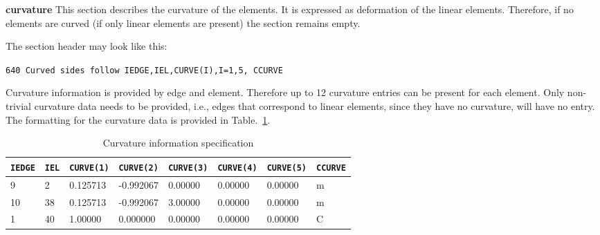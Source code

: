 \begin{description}
%


\item{\bf curvature} 
     This section describes the curvature of the elements. It is expressed as deformation of the linear elements.  
     Therefore, if no elements are curved (if only linear elements are present) the section remains empty.

     The section header may look like this:

     \begin{center}
     \texttt{640 Curved sides follow IEDGE,IEL,CURVE(I),I=1,5, CCURVE}
     \end{center}

     Curvature information is provided by edge and element. Therefore up to 12 curvature entries can be present for each element.
Only non-trivial curvature data needs to be provided, i.e., edges that correspond to linear elements, since they have no curvature, will have no entry.
The formatting for the curvature data is provided in Table.~\ref{tab:midside}. 

\footnotesize
\begin{table} 
     \begin{center}
\begin{tabular}{ l|l|l|l|l|l|l|l }
   \hline
 \texttt{IEDGE}& \texttt{IEL} &\texttt{CURVE(1)} &\texttt{CURVE(2)}&\texttt{CURVE(3)}&\texttt{CURVE(4)}&\texttt{CURVE(5)}&\texttt{CCURVE} \\ \hline \hline
 9   &  2 & 0.125713  &   -0.992067 &      0.00000  &     0.00000 &      0.00000  &   m \\
10   & 38 & 0.125713 &    -0.992067  &     3.00000 &      0.00000  &     0.00000 &    m \\
 1   & 40 & 1.00000  &     0.000000  &     0.00000 &      0.00000  &     0.00000 &    C \\
   \hline
\end{tabular}  
\caption{Curvature information specification } 
\label{tab:midside}
\end{center}
\end{table}
\normalsize


\end{description}
